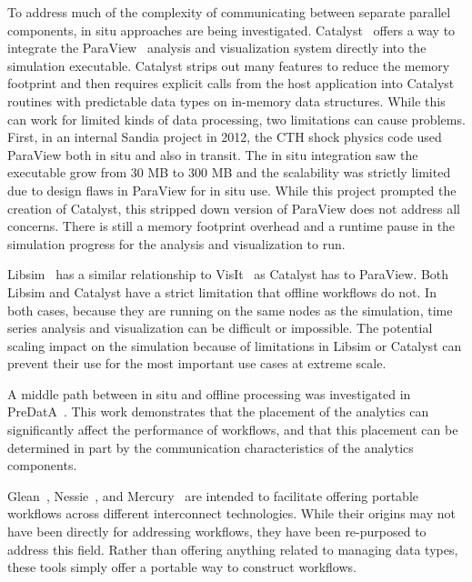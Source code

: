 \documentclass[conference]{IEEEtran}
\begin{document}
To address much of the complexity of communicating between separate parallel
components, in situ approaches are being investigated.
Catalyst~\cite{karimabadi:2013:catalyst} offers a way to integrate the
ParaView~\cite{Moreland:2008:paraview} analysis and visualization system
directly into the simulation executable. Catalyst strips out many features to
reduce the memory footprint and then requires explicit calls from the host
application into Catalyst routines with predictable data types on in-memory
data structures. While this can work for limited kinds of data processing, two
limitations can cause problems. First, in an internal Sandia project in 2012,
the CTH shock physics code used ParaView both in situ and also in transit. The
in situ integration saw the executable grow from 30 MB to 300 MB and the
scalability was strictly limited due to design flaws in ParaView for in situ
use. While this project prompted the creation of Catalyst, this stripped down
version of ParaView does not address all concerns. There is still a memory
footprint overhead and a runtime pause in the simulation progress for the
analysis and visualization to run.

Libsim~\cite{whitlock:2011:libsim} has a similar relationship to
VisIt~\cite{Riedel:2007:visit} as Catalyst has to ParaView. Both Libsim and
Catalyst have a strict limitation that offline workflows do not. In both cases,
because they are running on the same nodes as the simulation, time series
analysis and visualization can be difficult or impossible. The potential
scaling impact on the simulation because of limitations in Libsim or Catalyst
can prevent their use for the most important use cases at extreme scale.

A middle path between in situ and offline processing was investigated in
PreDatA~\cite{zheng:2010:predata}.
This work demonstrates that the placement of the analytics can significantly
affect the performance of workflows, and that this placement can be determined
in part by the communication characteristics of the analytics components.

Glean~\cite{vishwanath:2011:glean}, Nessie~\cite{oldfield:lwfs-data-movement},
and Mercury~\cite{Soumagne:2013:mercury} are intended to facilitate offering
portable workflows across different interconnect technologies. While their
origins may not have been directly for addressing workflows, they have been
re-purposed to address this field. Rather than offering anything related to
managing data types, these tools simply offer a portable way to construct
workflows.
\end{document}
